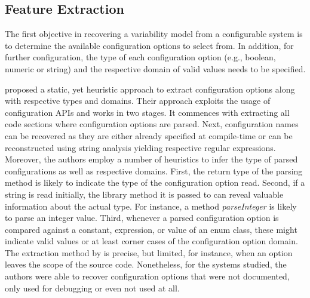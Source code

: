 \subsection{Feature Extraction} 
The first objective in recovering a variability model from a configurable
system is to determine the available configuration options to select
from. In addition, for further configuration, the type of each configuration
option (e.g., boolean, numeric or string) and the respective domain of valid values
needs to be specified.

\cite{rabkin_static_2011} proposed a static, yet heuristic approach to extract
configuration options along with respective types and domains. Their approach
exploits the usage of configuration APIs and works
in two stages. It commences with extracting all code sections where
configuration options are parsed. Next, configuration names can be
recovered as they are either already specified at compile-time or can be
reconstructed using string analysis yielding respective regular expressions.
Moreover, the authors employ a number of heuristics to infer the type of parsed
configurations as well as respective domains. First, the return type of the
parsing method is likely to indicate the type of the configuration option read.
Second, if a string is read initially, the library method it is passed to can
reveal valuable information about the actual type. For instance, a method
\emph{parseInteger} is likely to parse an integer value. Third, whenever a
parsed configuration option is compared against a constant, expression, or value
of an enum class, these might indicate valid values or at least corner cases of
the configuration option domain. The extraction method by
\cite{rabkin_static_2011} is precise, but limited, for instance, when an
option leaves the scope of the source code.
Nonetheless, for the systems studied, the authors were able to recover
configuration options that were not documented, only used for debugging or even not used at
all.

